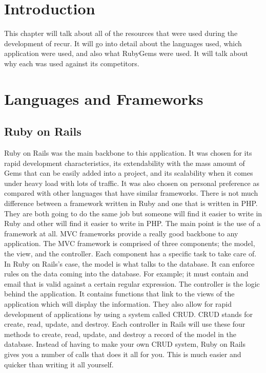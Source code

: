 \section{Introduction}
This chapter will talk about all of the resources that were used during the development of recur. It will go into detail about the languages used, which application were used, and also what RubyGems were used. It will talk about why each was used against its competitors.

\section{Languages and Frameworks}
\subsection{Ruby on Rails}
Ruby on Rails was the main backbone to this application. It was chosen for its rapid development characteristics, its extendability with the mass amount of Gems that can be easily added into a project, and its scalability when it comes under heavy load with lots of traffic. It was also chosen on personal preference as compared with other languages that have similar frameworks. There is not much difference between a framework written in Ruby and one that is written in PHP. They are both going to do the same job but someone will find it easier to write in Ruby and other will find it easier to write in PHP. The main point is the use of a framework at all. MVC frameworks provide a really good backbone to any application. The MVC framework is comprised of three components; the model, the view, and the controller. Each component has a specific task to take care of. In Ruby on Rails's case, the model is what talks to the database. It can enforce rules on the data coming into the database. For example; it must contain and email that is valid against a certain regular expression. The controller is the logic behind the application. It contains functions that link to the views of the application which will display the information. They also allow for rapid development of applications by using a system called CRUD. CRUD stands for create, read, update, and destroy. Each controller in Rails will use these four methods to create, read, update, and destroy a record of the model in the database. Instead of having to make your own CRUD system, Ruby on Rails gives you a number of calls that does it all for you. This is much easier and quicker than writing it all yourself.\\

